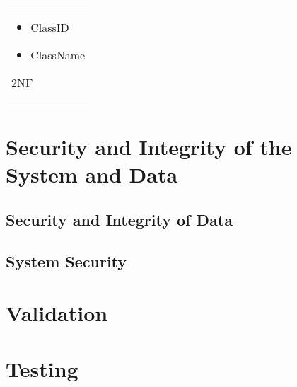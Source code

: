 \begin{center}
\begin{tabular}{|p{}}
\begin{itemize}
      \item\underline{ClassID}
      \item ClassName

\end{itemize}
\hline

2NF &



    \end{tabular}
\end{center}


\section{Security and Integrity of the System and Data}

\subsection{Security and Integrity of Data}

\subsection{System Security}

\section{Validation}

\section{Testing}

